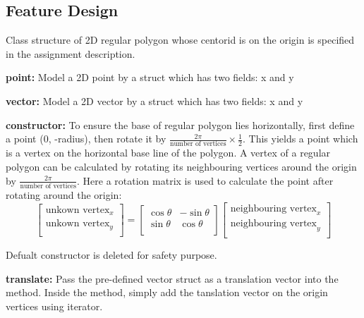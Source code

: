 \documentclass[12pt, a4paper]{article}
\begin{document}
\subsection{Feature Design}
Class structure of 2D regular polygon whose centorid is on the origin is specified in the assignment description.

\textbf{point:} Model a 2D point by a struct which has two fields: x and y

\textbf{vector:} Model a 2D vector by a struct which has two fields: x and y

\textbf{constructor:} To ensure the base of regular polygon lies horizontally, first define a point (0, -radius), then rotate it by $\frac{2\pi}{\text{number of vertices}} \times \frac{1}{2}$. This yields a point which is a vertex on the horizontal base line of the polygon. A vertex of a regular polygon can be calculated by rotating its neighbouring vertices around the origin by $\frac{2\pi}{\text{number of vertices}}$. Here a rotation matrix is used to calculate the point after rotating around the origin:
\begin{equation} 
  \begin{bmatrix}
    \text{unkown vertex}_x \\
    \text{unkown vertex}_y \\
  \end{bmatrix}
  =
  \begin{bmatrix}
    \cos\theta & -\sin\theta \\
    \sin\theta & \cos\theta \\
  \end{bmatrix}
  \begin{bmatrix}
    \text{neighbouring vertex}_x \\
    \text{neighbouring vertex}_y \\
  \end{bmatrix}
\end{equation}

Defualt constructor is deleted for safety purpose.

\textbf{translate:} Pass the pre-defined vector struct as a translation vector into the method. Inside the method, simply add the tanslation vector on the origin vertices using iterator.
\end{document}
